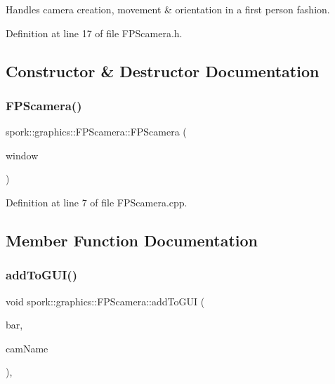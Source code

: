 Handles camera creation, movement \& orientation in a first person fashion. 

Definition at line 17 of file F\+P\+Scamera.\+h.



\subsection{Constructor \& Destructor Documentation}
\mbox{\label{classspork_1_1graphics_1_1_f_p_scamera_a4f0b6c921a7bec7e9aab63d63932f9ae}} 
\subsubsection{\texorpdfstring{F\+P\+Scamera()}{FPScamera()}}
{\footnotesize\ttfamily spork\+::graphics\+::\+F\+P\+Scamera\+::\+F\+P\+Scamera (\begin{DoxyParamCaption}\item[{\hyperlink{classspork_1_1graphics_1_1_window}{Window} $\ast$}]{window }\end{DoxyParamCaption})}



Definition at line 7 of file F\+P\+Scamera.\+cpp.



\subsection{Member Function Documentation}
\mbox{\label{classspork_1_1graphics_1_1_f_p_scamera_a8bf998a5b4adaab430a283ce6f6cd124}} 
\subsubsection{\texorpdfstring{add\+To\+G\+U\+I()}{addToGUI()}}
{\footnotesize\ttfamily void spork\+::graphics\+::\+F\+P\+Scamera\+::add\+To\+G\+UI (\begin{DoxyParamCaption}\item[{Tw\+Bar $\ast$}]{bar,  }\item[{const char $\ast$}]{cam\+Name }\end{DoxyParamCaption})\hspace{0.3cm}{\ttfamily [override]}, {\ttfamily [virtual]}}



